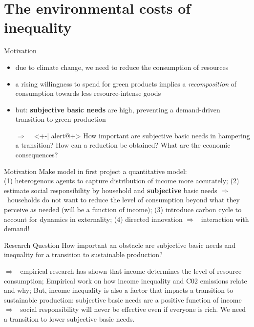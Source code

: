 \documentclass[11pt,aspectratio=169]{beamer}
\newcommand{\ar}{$\Rightarrow$ \ }
\begin{document}
\section{The environmental costs of inequality}

\begin{frame}{Motivation}
	
	\begin{itemize}[<+-| alert@+>]
		
		\item<+-| alert@+> due to climate change, we need to reduce the consumption of resources
		\vspace{4mm}
		\item<+-| alert@+> a rising willingness to spend for green products implies a \textit{recomposition} of consumption towards less resource-intense goods
		\vspace{4mm}
		\item<+-| alert@+>  but: \textbf{\textcolor{cyan!100}{subjective basic needs}} are high, preventing a demand-driven transition to green production
		\vspace{4mm}
		\item[\ar]<+-| alert@+> How important are subjective basic needs in hampering a transition? How can a reduction be obtained? What are the economic consequences?
	\end{itemize}
\end{frame}


\begin{frame}{Motivation}
	Make model in first project a quantitative model:\\ (1) heterogenous agents to capture distribution of income more accurately;  (2) estimate social responsibility by household and \textbf{subjective} basic needs \ar households do not want to reduce the level of consumption beyond what they perceive as needed (will be a function of income);  (3) introduce carbon cycle to account for dynamics in externality; (4) directed innovation \ar interaction with demand!  \\
	
	\begin{block}{Research Question}
How important an obstacle are subjective basic needs and inequality for a transition to sustainable production?
\end{block}
	\ar empirical research has shown that income determines the level of resource consumption; Empirical work on how income inequality and C02 emissions relate and why; But, income inequality is also a factor that impacts a transition to sustainable production: subjective basic needs are a positive function of income \ar social responsibility will never be effective even if everyone is rich. We need a transition to lower subjective basic needs. 
	
	
\end{frame}
\end{document}
